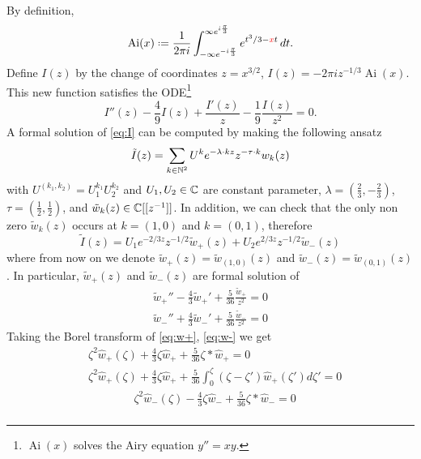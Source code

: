 \documentclass[11pt,a4paper,twoside,leqno,noamsfonts]{amsart}
\numberwithin{equation}{section}
\DeclareMathOperator{\Ai}{Ai}
\begin{document}
\begin{example}[Airy]
By definition,
\[ \Ai(x) \defeq \frac{1}{2\pi i}\int_{-\infty e^{-i\frac{\pi}{3}}}^{\infty e^{i\frac{\pi}{3}}} e^{t^3/3 - \textcolor{red}{x} t}\,dt. \]
Define $I(z)$ by the change of coordinates $z=x^{3/2}$, $I(z)=-2\pi iz^{-1/3}\Ai(x)$. This new function satisfies the ODE\footnote{$\Ai(x)$ solves the Airy equation $y''=xy$.}
\begin{equation}\label{eq:I}
I''(z)-\frac{4}{9}I(z)+\frac{I'(z)}{z}-\frac{1}{9}\frac{I(z)}{z^2} = 0.
\end{equation}
A formal solution of \eqref{eq:I} can be computed by making the following ansatz 
\begin{equation}
\tilde{I}(z)=\sum_{k\in\mathbb N^2}U^ke^{-\lambda\cdot k z}z^{-\tau\cdot k}w_k(z)
\end{equation}
with $U^{(k_1,k_2)}=U_1^{k_1}U_2^{k_2}$ and $U_1,U_2\in\mathbb C$ are constant parameter, $\lambda=(\frac{2}{3},-\frac{2}{3})$, $\tau=(\frac{1}{2},\frac{1}{2})$, and $\tilde{w}_k(z)\in\mathbb C[[z^{-1}]]$. In addition, we can check that the only non zero $\tilde{w}_k(z)$ occurs at $k=(1,0)$ and $k=(0,1)$, therefore
\begin{equation}
\tilde{I}(z)=U_1e^{-2/3z}z^{-1/2}\tilde{w}_{+}(z)+U_2e^{2/3z}z^{-1/2}\tilde{w}_{-}(z)
\end{equation}  
where from now on we denote $\tilde{w}_+(z)=\tilde{w}_{(1,0)}(z)$ and $\tilde{w}_-(z)=\tilde{w}_{(0,1)}(z)$. In particular, $\tilde{w}_+(z)$ and $\tilde{w}_-(z)$ are formal solution of 
\begin{align}
\label{eq:w+} \tilde{w}_+''-\frac{4}{3}\tilde{w}_+'+\frac{5}{36}\frac{\tilde{w}_+}{z^2}=0\\
\label{eq:w-} \tilde{w}_-''+\frac{4}{3}\tilde{w}_-'+\frac{5}{36}\frac{\tilde{w}_-}{z^2}=0
\end{align}
Taking the Borel transform of \eqref{eq:w+}, \eqref{eq:w-} we get
\begin{align*}
&\zeta^2\hat{w}_{+}(\zeta)+\frac{4}{3}\zeta\hat{w}_{+}+\frac{5}{36}\zeta\ast\hat{w}_{+}=0\\
&\zeta^2\hat{w}_{+}(\zeta)+\frac{4}{3}\zeta\hat{w}_{+}+\frac{5}{36}\int_0^\zeta(\zeta-\zeta')\hat{w}_{+}(\zeta')d\zeta'=0
\end{align*}
\begin{align*}
&\zeta^2\hat{w}_{-}(\zeta)-\frac{4}{3}\zeta\hat{w}_{-}+\frac{5}{36}\zeta\ast\hat{w}_{-}=0\\

\end{align*}
\end{example}
\end{document}
